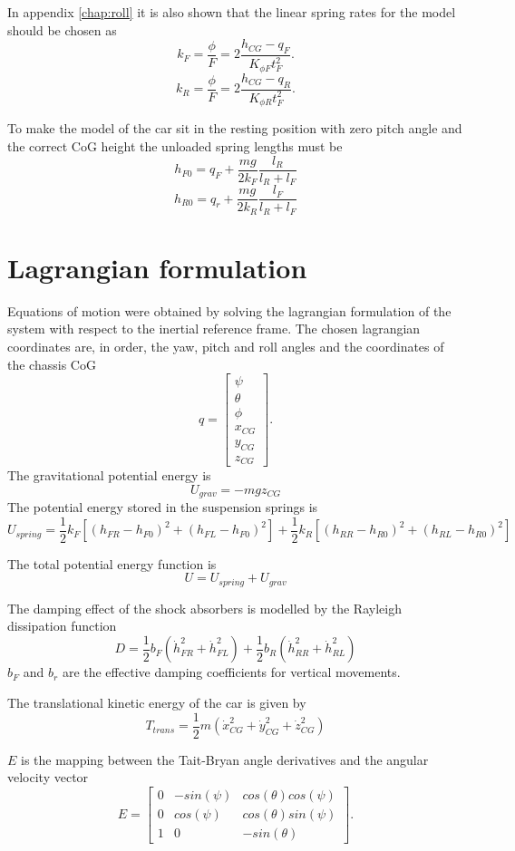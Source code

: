 In appendix \ref{chap:roll} it is also shown that the linear spring rates for the model should be chosen as
$$
k_F = \frac{\phi}{F} = 2\frac{h_{CG}-q_F}{K_{\phi F} t_F^2}.
$$
$$
k_R = \frac{\phi}{F} = 2\frac{h_{CG}-q_R}{K_{\phi R} t_F^2}.
$$

To make the model of the car sit in the resting position with zero pitch angle and the correct CoG height the unloaded spring lengths must be
$$ h_{F0} = q_F + \frac{mg}{2k_F}\frac{l_R}{l_R+l_F} $$
$$ h_{R0} = q_r + \frac{mg}{2k_R}\frac{l_F}{l_R+l_F} $$

\section{Lagrangian formulation}
\label{sec:6doflag}
Equations of motion were obtained by solving the lagrangian formulation of the system with respect to the inertial reference frame.
The chosen lagrangian coordinates are, in order, the yaw, pitch and roll angles and the coordinates of the chassis CoG
$$
q = \begin{bmatrix}
\psi \\
\theta \\
\phi \\
x_{CG} \\
y_{CG} \\
z_{CG}
\end{bmatrix}.
$$
The gravitational potential energy is
$$U_{grav} = -mgz_{CG}$$
The potential energy stored in the suspension springs is
$$ U_{spring} = \frac{1}{2} k_F [(h_{FR} - h_{F0})^2 + (h_{FL} - h_{F0})^2] +  \frac{1}{2} k_R [(h_{RR} - h_{R0})^2 + (h_{RL} - h_{R0})^2] $$

The total potential energy function is
$$ U = U_{spring} + U_{grav} $$

The damping effect of the shock absorbers is modelled by the Rayleigh dissipation function
$$ D = \frac{1}{2} b_F (\dot h_{FR}^2 + \dot h_{FL}^2) + \frac{1}{2} b_R (\dot h_{RR}^2 + \dot h_{RL}^2) $$
$b_F$ and $b_r$ are the effective damping coefficients for vertical movements.

The translational kinetic energy of the car is given by
$$ T_{trans} = \frac{1}{2} m (\dot x_{CG}^2 +\dot y_{CG}^2 +\dot z_{CG}^2 ) $$

$E$ is the mapping between the Tait-Bryan angle derivatives and the angular velocity vector
$$
E=\begin{bmatrix}
0 & -sin(\psi)      & cos(\theta)cos(\psi)\\
0      & cos(\psi) &  cos(\theta)sin(\psi) \\
1 & 0      & -sin(\theta)
\end{bmatrix}.
$$

